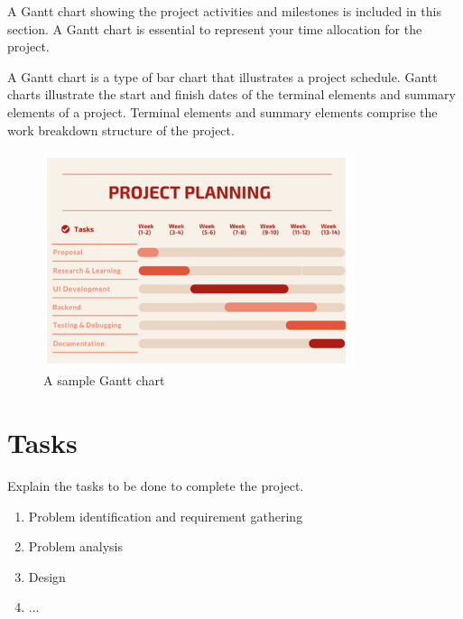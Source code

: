 \documentclass{projectreport}
\begin{document}
	A Gantt chart showing the project activities and milestones is included in this section. A Gantt chart is essential to represent your time allocation for the project.
	
	A Gantt chart is a type of bar chart that illustrates a project schedule. Gantt charts illustrate the start and finish dates of the terminal elements and summary elements of a project. Terminal elements and summary elements comprise the work breakdown structure of the project.
	
	\begin{figure}[h!]
		\centering
		\includegraphics[width=0.8\textwidth]{gantt}
		\caption{A sample Gantt chart}
		\label{fig:gantt}
	\end{figure}

	\section{Tasks}
	
	Explain the tasks to be done to complete the project. 
	
	\begin{enumerate}
		\item Problem identification and requirement gathering
		\item Problem analysis
		\item Design 
		\item ...
	\end{enumerate}
	
	
	
	
	
	
\end{document}
